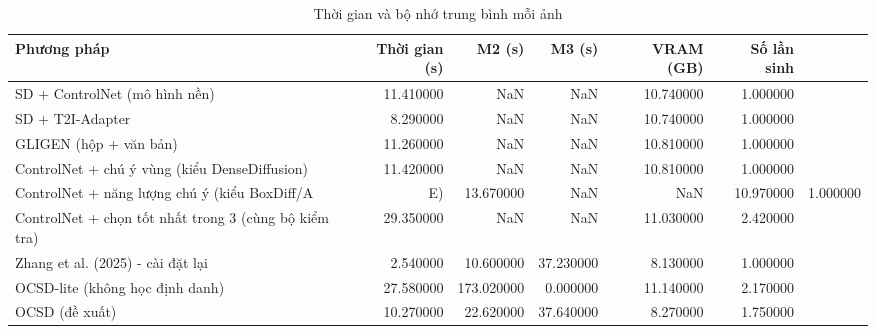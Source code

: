 \begin{table}
\caption{Thời gian và bộ nhớ trung bình mỗi ảnh}
\begin{tabular}{lrrrrr}
\toprule
Phương pháp & Thời gian (s) & M2 (s) & M3 (s) & VRAM (GB) & Số lần sinh \\
\midrule
SD + ControlNet (mô hình nền) & 11.410000 & NaN & NaN & 10.740000 & 1.000000 \\
SD + T2I-Adapter & 8.290000 & NaN & NaN & 10.740000 & 1.000000 \\
GLIGEN (hộp + văn bản) & 11.260000 & NaN & NaN & 10.810000 & 1.000000 \\
ControlNet + chú ý vùng (kiểu DenseDiffusion) & 11.420000 & NaN & NaN & 10.810000 & 1.000000 \\
ControlNet + năng lượng chú ý (kiểu BoxDiff/A&E) & 13.670000 & NaN & NaN & 10.970000 & 1.000000 \\
ControlNet + chọn tốt nhất trong 3 (cùng bộ kiểm tra) & 29.350000 & NaN & NaN & 11.030000 & 2.420000 \\
Zhang et al. (2025) - cài đặt lại & 2.540000 & 10.600000 & 37.230000 & 8.130000 & 1.000000 \\
OCSD-lite (không học định danh) & 27.580000 & 173.020000 & 0.000000 & 11.140000 & 2.170000 \\
OCSD (đề xuất) & 10.270000 & 22.620000 & 37.640000 & 8.270000 & 1.750000 \\
\bottomrule
\end{tabular}
\end{table}
